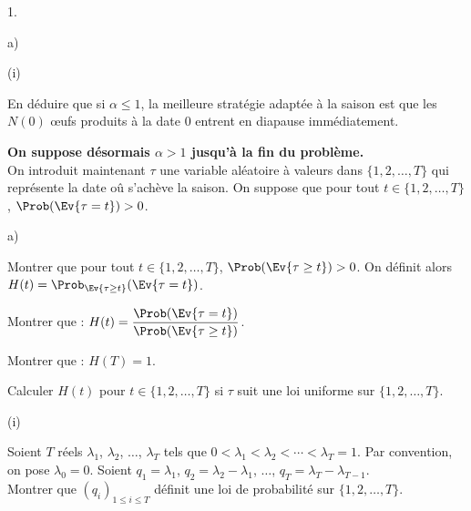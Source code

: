 \begin{noliste}{1.}
\begin{noliste}{a)}
\begin{nonoliste}{(i)}
      
      
      

      
      \item En déduire que si $\alpha \leq 1$, la meilleure stratégie 
      adaptée à la saison est que les $N(0)$ {\oe}ufs produits à la date
      $0$ entrent en diapause immédiatement.
      
      

    \end{nonoliste}
  \end{noliste}
  
  \item {\bf On suppose désormais $\alpha >1$ jusqu'à la fin du 
  problème.}\\
  On introduit maintenant $\tau$ une variable aléatoire à valeurs dans 
  $\{1,2, \ldots, T\}$ qui représente la date oû s'achève la saison. On 
  suppose que pour tout $t \in \{1,2, \ldots, T\}$, $\Prob(
  \Ev{\tau=t}) >0$.
  \begin{noliste}{a)}
    \setlength{\itemsep}{2mm}
    \item Montrer que pour tout $t\in \{1,2, \ldots, T\}$, $\Prob(
    \Ev{\tau \geq t}) >0$. On définit alors $H(t)= \Prob_{\Ev{\tau \geq 
    t}}(\Ev{\tau =t})$.
    
    

    
    \item Montrer que : $H(t)= \dfrac{\Prob(\Ev{\tau=t})}{\Prob(\Ev{\tau
    \geq t})}$.
    
    

    
    \item Montrer que : $H(T)=1$.
    
    
    
    

    
    \item Calculer $H(t)$ pour $t\in \{1,2, \ldots, T\}$ si $\tau$ 
    suit une loi uniforme sur $\{1,2, \ldots, T\}$.
    
    

    
    \item 
    \begin{nonoliste}{(i)}
      \item Soient $T$ réels $\lambda_1$, $\lambda_2$, $\ldots$, 
      $\lambda_T$ tels que $0 < \lambda_1 < \lambda_2 < \cdots < 
      \lambda_T=1$. Par convention, on pose $\lambda_0=0$. Soient 
      $q_1=\lambda_1$, $q_2=\lambda_2-\lambda_1$, $\ldots$, 
      $q_T=\lambda_T - \lambda_{T-1}$.\\
      Montrer que $(q_i)_{1\leq i \leq T}$ définit une loi de 
      probabilité sur $\{1,2, \ldots, T\}$.
      

\end{nonoliste}
\end{noliste}
\end{noliste}
